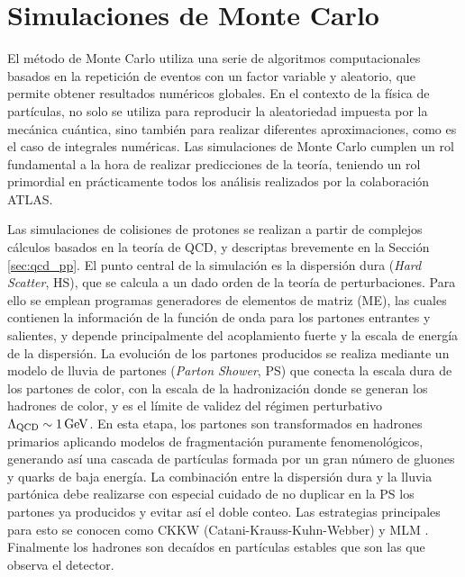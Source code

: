 

\section{Simulaciones de Monte Carlo}


El método de Monte Carlo utiliza una serie de algoritmos computacionales basados en la repetición de eventos con un factor variable y aleatorio, que permite obtener resultados numéricos globales.
En el contexto de la física de partículas, no solo se utiliza para reproducir la aleatoriedad impuesta por la mecánica cuántica, sino también para realizar diferentes aproximaciones, como es el caso de integrales numéricas.
Las simulaciones de Monte Carlo cumplen un rol fundamental a la hora de realizar predicciones de la teoría, teniendo un rol primordial en prácticamente todos los análisis realizados por la colaboración ATLAS. 

Las simulaciones de colisiones de protones se realizan a partir de complejos cálculos basados en la teoría de QCD, y descriptas brevemente en la Sección \ref{sec:qcd_pp}. 
El punto central de la simulación es la dispersión dura (\textit{Hard Scatter}, HS), que se calcula a un dado orden de la teoría de perturbaciones. Para ello se emplean programas generadores de elementos de matriz (ME), las cuales contienen la información de la función de onda para los partones entrantes y salientes, y depende principalmente del acoplamiento
fuerte y la escala de energía de la dispersión. La evolución de los partones producidos se realiza mediante un modelo de lluvia de partones (\textit{Parton Shower}, PS) que conecta la escala dura de los partones de color, con la escala de la hadronización donde se generan los hadrones de color, y es el límite de validez del régimen perturbativo $\Lambda_{\text{QCD}}\sim 1\,\text{GeV}$. En esta etapa, los partones son transformados en hadrones primarios aplicando modelos de fragmentación puramente fenomenológicos, generando así una cascada de partículas formada por un gran número de gluones y quarks de baja energía. La combinación entre la dispersión dura y la lluvia partónica debe realizarse
con especial cuidado de no duplicar en la PS los partones ya producidos y evitar
así el doble conteo. Las estrategias principales para esto se conocen como CKKW
(Catani-Krauss-Kuhn-Webber) \cite{ckkw_1, ckkw_2} y MLM \cite{mlm}. Finalmente los hadrones son decaídos en partículas estables que son las que observa el detector.

